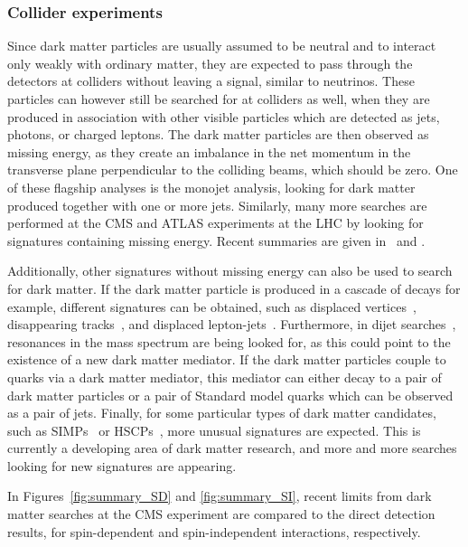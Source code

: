 \subsubsection{Collider experiments}

Since dark matter particles are usually assumed to be neutral and to interact only weakly with ordinary matter, they are expected to pass through the detectors at colliders without leaving a signal, similar to neutrinos. These particles can however still be searched for at colliders as well, when they are produced in association with other visible particles which are detected as jets, photons, or charged leptons. The dark matter particles are then observed as missing energy, as they create an imbalance in the net momentum in the transverse plane perpendicular to the colliding beams, which should be zero. One of these flagship analyses is the monojet analysis, looking for dark matter produced together with one or more jets\cite{Sirunyan:2017hci,Aaboud:2016qgg}. Similarly, many more searches are performed at the \acs{CMS} and \acs{ATLAS} experiments at the \ac{LHC} by looking for signatures containing missing energy. Recent summaries are given in~\cite{Kahlhoefer:2017dnp} and \cite{Buchmueller:2017qhf}.

Additionally, other signatures without missing energy can also be used to search for dark matter. If the dark matter particle is produced in a cascade of decays for example, different signatures can be obtained, such as displaced vertices~\cite{ATLAS:2017bvh}, disappearing tracks~\cite{ATLAS:2017bna}, and displaced lepton-jets~\cite{ATLAS:2017lvz}. Furthermore, in dijet searches~\cite{Sirunyan:2017ygf, Sirunyan:2016iap, Aaboud:2017yvp}, resonances in the mass spectrum are being looked for, as this could point to the existence of a new dark matter mediator. If the dark matter particles couple to quarks via a dark matter mediator, this mediator can either decay to a pair of dark matter particles or a pair of Standard model quarks which can be observed as a pair of jets.  Finally, for some particular types of dark matter candidates, such as \acfp{SIMP}~\cite{Bai:2011wy} or \acp{HSCP}~\cite{CMS:2016ybj,Aaboud:2016dgf}, more unusual signatures are expected. This is currently a developing area of dark matter research, and more and more searches looking for new signatures are appearing.

In Figures~\ref{fig:summary_SD} and \ref{fig:summary_SI}, recent limits from dark matter searches at the \acs{CMS} experiment are compared to the direct detection results, for spin-dependent and spin-independent interactions, respectively.

